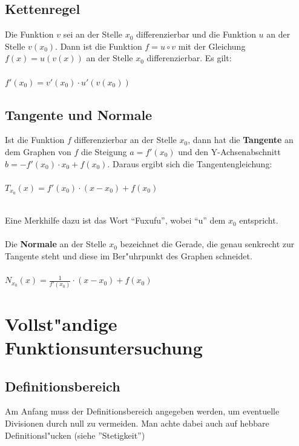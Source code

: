 \subsection{Kettenregel}
\begin{Definition}
Die Funktion $v$ sei an der Stelle $x_{0}$ differenzierbar und die Funktion $u$ an der Stelle $v(x_{0})$. Dann ist die Funktion $f=u\circ v$ mit der Gleichung $f(x)= u(v(x))$ an der Stelle $x_{0}$ differenzierbar. Es gilt:\\
\\
$f'(x_{0})=v'(x_{0})\cdot u'(v(x_{0}))$
\end{Definition}

\subsection{Tangente und Normale}
\begin{Definition}
Ist die Funktion $f$ differenzierbar an der Stelle $x_{0}$, dann hat die \textbf{Tangente} an dem Graphen von $f$ die Steigung $a=f'(x_{0})$ und den Y-Achsenabschnitt $b=-f'(x_{0})\cdot x_{0}+f(x_{0})$. Daraus ergibt sich die Tangentengleichung:\\
\\
$T_{x_{0}}(x)=f'(x_{0})\cdot (x-x_{0})+f(x_{0}) $ \\
\end{Definition}
\\
Eine Merkhilfe dazu ist das Wort "`Fuxufu"', wobei "`u"' dem $x_{0}$ entspricht.\\
\\
Die \textbf{Normale} an der Stelle $x_{0}$ bezeichnet die Gerade, die genau senkrecht zur Tangente steht und diese im Ber"uhrpunkt des Graphen schneidet.\\
\\
$N_{x_{0}}(x)=\frac{1}{f'(x_{0})}\cdot (x-x_{0})+f(x_{0})$\\


\section{Vollst"andige Funktionsuntersuchung}


\subsection{Definitionsbereich}

Am Anfang muss der Definitionsbereich angegeben werden, um eventuelle Divisionen durch null zu vermeiden. Man achte dabei auch auf hebbare Definitionsl"ucken (siehe ''Stetigkeit'') \\


